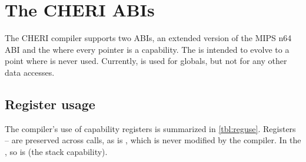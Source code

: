 \chapter{The CHERI ABIs}
\label{chp:abis}
\label{chap:abis} %

The CHERI compiler supports two ABIs, an extended version of the MIPS n64 ABI and the \sandboxABI{} where every pointer is a capability.
The \sandboxABI{} is intended to evolve to a point where  is never used.
Currently,  is used for globals, but not for any other data accesses.

\section{Register usage}

The compiler's use of capability registers is summarized in \autoref{tbl:reguse}.
Registers -- are preserved across calls, as is , which is never modified by the compiler.
In the \sandboxABI{}, so is  (the stack capability).

